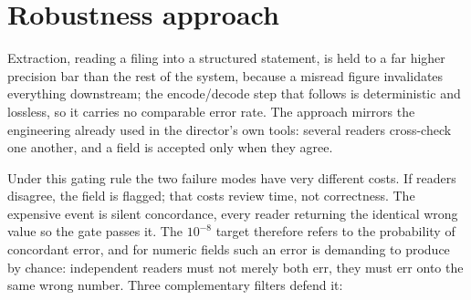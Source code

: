 \documentclass[11pt]{article}
\begin{document}
\section{Robustness approach}
\label{sec:robustness}
Extraction, reading a filing into a structured statement, is held to a far higher precision bar than the rest of the system, because a misread figure invalidates everything downstream; the encode/decode step that follows is deterministic and lossless, so it carries no comparable error rate. The approach mirrors the engineering already used in the director's own tools: several readers cross-check one another, and a field is accepted only when they agree.

Under this gating rule the two failure modes have very different costs. If readers disagree, the field is flagged; that costs review time, not correctness. The expensive event is silent concordance, every reader returning the identical wrong value so the gate passes it. The $10^{-8}$ target therefore refers to the probability of concordant error, and for numeric fields such an error is demanding to produce by chance: independent readers must not merely both err, they must err onto the same wrong number. Three complementary filters defend it:
\end{document}
